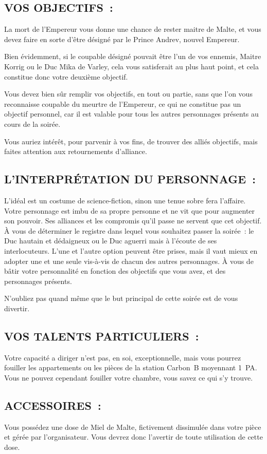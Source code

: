 \documentclass[14pt,twocolumn]{extarticle}
\begin{document}
\subsection{VOS OBJECTIFS~:}

La mort de l'Empereur vous donne une chance de rester maitre de Malte, et vous
devez faire en sorte d'être désigné par le Prince Andrev, nouvel Empereur.

Bien évidemment, si le coupable désigné pouvait être l'un de vos ennemis,
Maitre Korrig ou le Duc Mika de Varley, cela vous satisferait au plus haut
point, et cela constitue donc votre deuxième objectif.

Vous devez bien sûr remplir vos objectifs, en tout ou partie, sans que l'on
vous reconnaisse coupable du meurtre de l'Empereur, ce qui ne constitue pas un
objectif personnel, car il est valable pour tous les autres personnages
présents au cours de la soirée.

Vous auriez intérêt, pour parvenir à vos fins, de trouver des alliés objectifs,
mais faites attention aux retournements d'alliance.

\subsection{L'INTERPRÉTATION DU PERSONNAGE~:}

L'idéal est un costume de science-fiction, sinon une tenue sobre fera
l'affaire. Votre personnage est imbu de sa propre personne et ne vit que pour
augmenter son pouvoir. Ses alliances et les compromis qu'il passe ne servent
que cet objectif. À vous de déterminer le registre dans lequel vous souhaitez
passer la soirée~: le Duc hautain et dédaigneux ou le Duc aguerri mais à
l'écoute de ses interlocuteurs. L'une et l'autre option peuvent être prises,
mais il vaut mieux en adopter une et une seule vis-à-vis de chacun des autres
personnages. À vous de bâtir votre personnalité en fonction des objectifs que
vous avez, et des personnages présents.

N'oubliez pas quand même que le but principal de cette soirée est de vous
divertir.

\subsection{VOS TALENTS PARTICULIERS~:}

Votre capacité a diriger n'est pas, en soi, exceptionnelle, mais vous pourrez
fouiller les appartements ou les pièces de la station Carbon~B moyennant 1~PA.
Vous ne pouvez cependant fouiller votre chambre, vous savez ce qui s'y trouve.

\subsection{ACCESSOIRES~:}

Vous possédez une dose de Miel de Malte, fictivement dissimulée dans votre
pièce et gérée par l'organisateur. Vous devrez donc l'avertir de toute
utilisation de cette dose.
\end{document}
